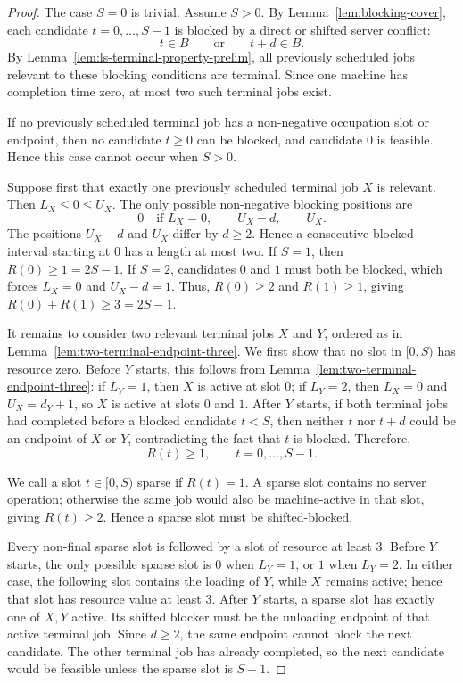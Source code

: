 \documentclass[11pt]{article}
\begin{document}
\begin{proof}
The case \(S=0\) is trivial. Assume \(S>0\). By
Lemma~\ref{lem:blocking-cover}, each candidate \(t=0,\ldots,S-1\) is blocked by
a direct or shifted server conflict:
\[
        t\in B
        \qquad\text{or}\qquad
        t+d\in B .
\]
By Lemma~\ref{lem:ls-terminal-property-prelim}, all previously scheduled jobs relevant to these
blocking conditions are terminal. Since one machine has completion time zero, at most
two such terminal jobs exist.

If no previously scheduled terminal job has a non-negative occupation slot or endpoint, then no
candidate \(t\ge0\) can be blocked, and candidate \(0\) is feasible. Hence this
case cannot occur when \(S>0\).

Suppose first that exactly one previously scheduled terminal job \(X\) is relevant. Then
\(L_X\le0\le U_X\). The only possible non-negative blocking positions are
\[
        0 \quad\text{if }L_X=0,\qquad U_X-d,\qquad U_X .
\]
The positions \(U_X-d\) and \(U_X\) differ by \(d\ge2\). Hence a consecutive
blocked interval starting at \(0\) has a length at most two. If \(S=1\), then
\(R(0)\ge1=2S-1\). If \(S=2\), candidates \(0\) and \(1\) must both be blocked,
which forces \(L_X=0\) and \(U_X-d=1\). Thus, \(R(0)\ge2\) and \(R(1)\ge1\),
giving \(R(0)+R(1)\ge3=2S-1\).

It remains to consider two relevant terminal jobs \(X\) and \(Y\), ordered as in
Lemma~\ref{lem:two-terminal-endpoint-three}. We first show that no slot in
\([0,S)\) has resource zero. Before \(Y\) starts, this follows from
Lemma~\ref{lem:two-terminal-endpoint-three}: if \(L_Y=1\), then \(X\) is active
at slot \(0\); if \(L_Y=2\), then \(L_X=0\) and \(U_X=d_Y+1\), so \(X\) is
active at slots \(0\) and \(1\). After \(Y\) starts, if both terminal jobs had
completed before a blocked candidate \(t<S\), then neither \(t\) nor \(t+d\)
could be an endpoint of \(X\) or \(Y\), contradicting the fact that \(t\) is
blocked. Therefore,
\[
        R(t)\ge1,\qquad t=0,\ldots,S-1 .
\]

We call a slot \(t\in[0,S)\) sparse if \(R(t)=1\). A sparse slot contains no server
operation; otherwise the same job would also be machine-active in that slot,
giving \(R(t)\ge2\). Hence a sparse slot must be shifted-blocked.

Every non-final sparse slot is followed by a slot of resource at least \(3\).
Before \(Y\) starts, the only possible sparse slot is \(0\) when \(L_Y=1\), or
\(1\) when \(L_Y=2\). In either case, the following slot contains the loading of
\(Y\), while \(X\) remains active; hence that slot has resource value at least \(3\).
After \(Y\) starts, a sparse slot has exactly one of \(X,Y\) active. Its shifted
blocker must be the unloading endpoint of that active terminal job. Since
\(d\ge2\), the same endpoint cannot block the next candidate. The other terminal
job has already completed, so the next candidate would be feasible unless the
sparse slot is \(S-1\).


\end{proof}
\end{document}

